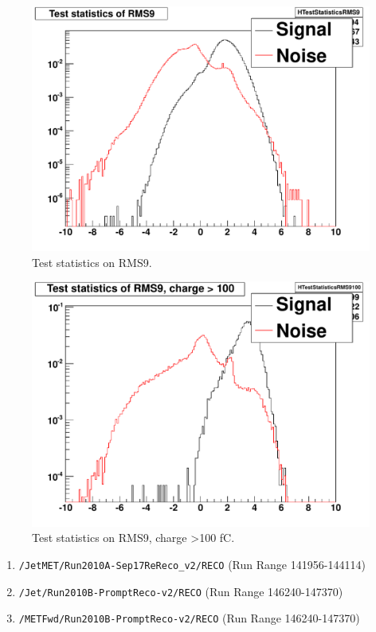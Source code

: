 \begin{figure}
\includegraphics[width=120mm]{DailyLog/6275/6275HTestStatisticsRMS9.pdf}
\caption{Test statistics on RMS9.}
\label{Figure_6275HTestStatisticsRMS9}
\end{figure}

\begin{figure}
\includegraphics[width=120mm]{DailyLog/6275/6275HTestStatisticsRMS9100.pdf}
\caption{Test statistics on RMS9, charge \textgreater 100 fC.}
\label{Figure_6275HTestStatisticsRMS9100}
\end{figure}


\begin{enumerate}
\item \texttt{/JetMET/Run2010A-Sep17ReReco\_v2/RECO}         (Run Range 141956-144114)
\item \texttt{/Jet/Run2010B-PromptReco-v2/RECO}                   (Run Range 146240-147370)
\item \texttt{/METFwd/Run2010B-PromptReco-v2/RECO}          (Run Range 146240-147370)
\end{enumerate}


